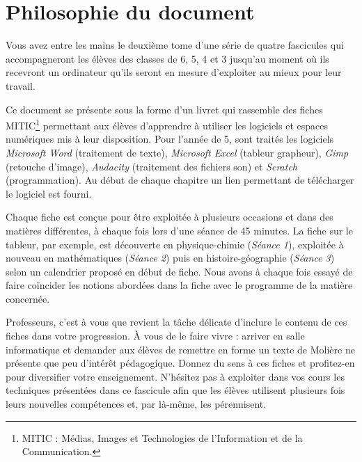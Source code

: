 \chapter*{Philosophie du document}



Vous avez entre les mains le deuxième tome d'une série de quatre fascicules qui accompagneront les élèves des classes de 6, 5, 4 et 3 jusqu'au moment où ils recevront un ordinateur qu'ils seront en mesure d'exploiter au mieux pour leur travail.

\vspace{18pt}

Ce document se présente sous la forme d'un livret qui rassemble des fiches MITIC\footnote{MITIC : Médias, Images et Technologies de l'Information et de la Communication.} permettant aux élèves d'apprendre à utiliser les logiciels et espaces numériques mis à leur disposition. Pour l'année de 5, sont traités les logiciels \emph{Microsoft Word} (traitement de texte), \emph{Microsoft Excel} (tableur grapheur), \emph{Gimp} (retouche d'image), \emph{Audacity} (traitement des fichiers son) et \emph{Scratch} (programmation). Au début de chaque chapitre un lien permettant de télécharger le logiciel est fourni.

\vspace{18pt}


Chaque fiche est conçue pour être exploitée à plusieurs occasions et dans des matières différentes, à chaque fois lors d'une séance de 45 minutes. La fiche sur le tableur, par exemple, est découverte en physique-chimie (\emph{Séance 1}), exploitée à nouveau en mathématiques (\emph{Séance 2}) puis en histoire-géographie (\emph{Séance 3}) selon un calendrier proposé en début de fiche. Nous avons à chaque fois essayé de faire coïncider les notions abordées dans la fiche avec le programme de la matière concernée.

\vspace{18pt}

Professeurs, c'est à vous que revient la tâche délicate d'inclure le contenu de ces fiches dans votre progression. À vous de le faire vivre : arriver en salle informatique et demander aux élèves de remettre en forme un texte de Molière ne présente que peu d'intérêt pédagogique. Donnez du sens à ces fiches et profitez-en pour diversifier votre enseignement. N'hésitez pas à exploiter dans vos cours les techniques présentées dans ce fascicule afin que les élèves utilisent plusieurs fois leurs nouvelles compétences et, par là-même, les pérennisent.

